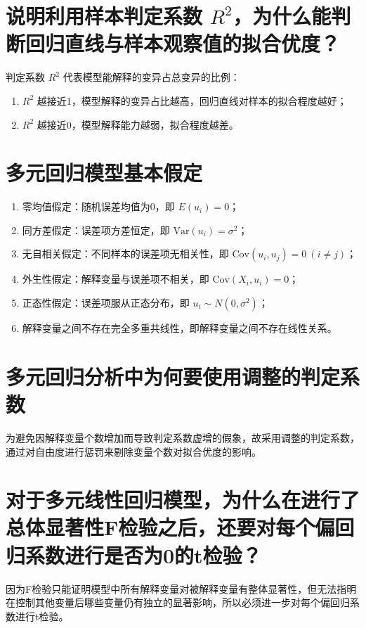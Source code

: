 \documentclass{ctexart}
\begin{document}
\section{说明利用样本判定系数 $R^2$，为什么能判断回归直线与样本观察值的拟合优度？}
判定系数 $R^2$ 代表模型能解释的变异占总变异的比例：
\begin{enumerate}
\item $R^2$ 越接近1，模型解释的变异占比越高，回归直线对样本的拟合程度越好；
\item $R^2$ 越接近0，模型解释能力越弱，拟合程度越差。
\end{enumerate}

\section{多元回归模型基本假定}
\begin{enumerate}
\item 零均值假定：随机误差均值为0，即 $E(u_i)=0$；
\item 同方差假定：误差项方差恒定，即 $\text{Var}(u_i)=\sigma^2$；
\item 无自相关假定：不同样本的误差项无相关性，即 $\text{Cov}(u_i,u_j)=0\ (i\neq j)$；
\item 外生性假定：解释变量与误差项不相关，即 $\text{Cov}(X_i,u_i)=0$；
\item 正态性假定：误差项服从正态分布，即 $u_i \sim N(0,\sigma^2)$；
\item 解释变量之间不存在完全多重共线性，即解释变量之间不存在线性关系。
\end{enumerate}

\section{多元回归分析中为何要使用调整的判定系数}
为避免因解释变量个数增加而导致判定系数虚增的假象，故采用调整的判定系数，通过对自由度进行惩罚来剔除变量个数对拟合优度的影响。

\section{对于多元线性回归模型，为什么在进行了总体显著性F检验之后，还要对每个偏回归系数进行是否为0的t检验？}
因为F检验只能证明模型中所有解释变量对被解释变量有整体显著性，但无法指明在控制其他变量后哪些变量仍有独立的显著影响，所以必须进一步对每个偏回归系数进行t检验。
\end{document}
